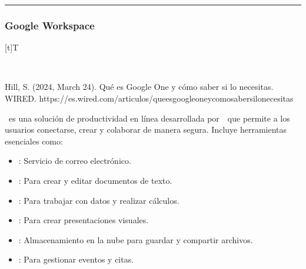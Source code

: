 \documentclass[letterpaper,10pt,spanish]{sphinxmanual}
\let\sphinxpxdimen\pdfpxdimen\else\newdimen\sphinxpxdimen
\begin{document}
\bigskip\hrule\bigskip



\subsubsection{Google Workspace}
\label{\detokenize{1_guias/10ofimatica/G1011:google-workspace}}

\begin{savenotes}\sphinxattablestart
\sphinxthistablewithglobalstyle
\centering
\begin{tabulary}{\linewidth}[t]{T}
\sphinxtoprule
\sphinxtableatstartofbodyhook

\begin{sphinxfigure-in-table}
\centering
\capstart
\noindent\sphinxincludegraphics[width=700\sphinxpxdimen]{{image015}.png}
\label{\detokenize{1_guias/10ofimatica/G1011:id9}}\end{sphinxfigure-in-table}\relax
\\
\sphinxbottomrule
\end{tabulary}
\sphinxtableafterendhook\par
\sphinxattableend\end{savenotes}

\sphinxAtStartPar
%
\begin{footnote}[2]\sphinxAtStartFootnote
Hill, S. (2024, March 24). Qué es Google One y cómo saber si lo necesitas. WIRED. https://es.wired.com/articulos/que\sphinxhyphen{}es\sphinxhyphen{}google\sphinxhyphen{}one\sphinxhyphen{}y\sphinxhyphen{}como\sphinxhyphen{}saber\sphinxhyphen{}si\sphinxhyphen{}lo\sphinxhyphen{}necesitas
%
\end{footnote}  es una solución de productividad en línea desarrollada por  que permite a los usuarios conectarse, crear y colaborar de manera segura. Incluye herramientas esenciales como:
\begin{itemize}
\item {} 
\sphinxAtStartPar
{}: Servicio de correo electrónico.

\item {} 
\sphinxAtStartPar
{}: Para crear y editar documentos de texto.

\item {} 
\sphinxAtStartPar
{}: Para trabajar con datos y realizar cálculos.

\item {} 
\sphinxAtStartPar
{}: Para crear presentaciones visuales.

\item {} 
\sphinxAtStartPar
{}: Almacenamiento en la nube para guardar y compartir archivos.

\item {} 
\sphinxAtStartPar
{}: Para gestionar eventos y citas.

\end{itemize}
\end{document}
